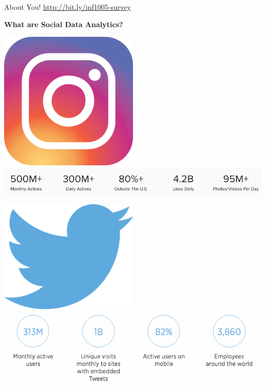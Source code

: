 \documentclass{beamer}
\begin{document}
\begin{frame}{About You!}
  \centering
  \url{http://bit.ly/inf1005-survey}
\end{frame}

\begin{frame}[plain]
  \begin{center}
    \bf \LARGE What are Social Data Analytics?
  \end{center}
\end{frame}

\begin{frame}[plain]
  \begin{center}
      \includegraphics[width=0.5\textwidth]{img/instagram-logo.png} \\
      \includegraphics[width=\textwidth]{img/instagram-stats.png} \\
  \end{center}
\end{frame}

\begin{frame}[plain]
  \begin{center}
      \includegraphics[width=0.5\textwidth]{img/twitter-logo.png} \\
      \includegraphics[width=\textwidth]{img/twitter-stats.png} \\
  \end{center}
\end{frame}
\end{document}

